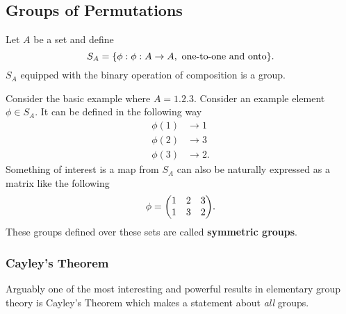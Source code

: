 \documentclass[../notes.tex]{subfiles}
\begin{document}

\subsection{Groups of Permutations}

\begin{theorem}
	Let $A$ be a set and define 
	\[
		S_A = \qty{\phi : \phi : A \to A, \text{ one-to-one and onto}}
	.\] 
	$S_A$ equipped with the binary operation of composition is a group.
\end{theorem}

Consider the basic example where $A = \qty{1,2,3}$. Consider an example element $\phi \in S_A$. It can be defined in the following way
\begin{align*}
	\phi(1) &\to 1 \\
	\phi(2) &\to 3 \\
	\phi(3) &\to 2
.\end{align*}
Something of interest is a map from $S_A$ can also be naturally expressed as a matrix like the following
\[
	\phi = \mqty(1 & 2 & 3 \\ 1 & 3 & 2)
.\]
These groups defined over these sets are called \textbf{symmetric groups}.

\subsubsection{Cayley's Theorem}

Arguably one of the most interesting and powerful results in elementary group theory is Cayley's Theorem which makes a statement about \textit{all} groups.
\end{document}
